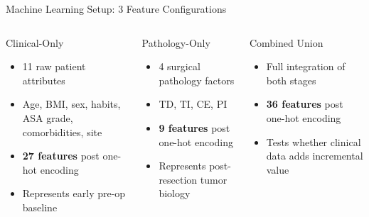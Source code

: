 \documentclass[10pt,aspectratio=169,xcolor={table,dvipsnames}]{beamer}
\begin{document}
\begin{frame}{Machine Learning Setup: 3 Feature Configurations}
  \begin{columns}[t]
      \begin{block}{\centering \small Clinical-Only}
        \vspace{0.1cm}
        \begin{itemize}\setlength{\itemsep}{2pt}
          \item {\tiny 11 raw patient attributes}
          \item {\tiny Age, BMI, sex, habits, ASA grade, comorbidities, site}
          \item \textbf{\scriptsize 27 features} {\tiny post one-hot encoding}
          \item {\tiny Represents early pre-op baseline}
        \end{itemize}
      \end{block}

      \begin{block}{\centering \small Pathology-Only}
        \vspace{0.1cm}
        \begin{itemize}\setlength{\itemsep}{2pt}
          \item {\tiny 4 surgical pathology factors}
          \item {\tiny TD, TI, CE, PI}
          \item \textbf{\scriptsize 9 features} {\tiny post one-hot encoding}
          \item {\tiny Represents post-resection tumor biology}
        \end{itemize}
      \end{block}

      \begin{block}{\centering \small Combined Union}
        \vspace{0.1cm}
        \begin{itemize}\setlength{\itemsep}{2pt}
          \item {\tiny Full integration of both stages}
          \item \textbf{\scriptsize 36 features} {\tiny post one-hot encoding}
          \item {\tiny Tests whether clinical data adds incremental value}
        \end{itemize}
      \end{block}
  \end{columns}


\end{frame}
\end{document}
